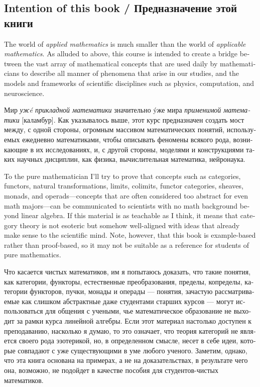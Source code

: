 \documentclass{book}
\theoremstyle{theoremENG}
\theoremstyle{lemmaENG}
\theoremstyle{propositionENG}
\theoremstyle{corollaryENG}
\theoremstyle{factENG}
\theoremstyle{remarkENG}
\theoremstyle{exampleENG}
\theoremstyle{warningENG}
\theoremstyle{questionENG}
\theoremstyle{guessENG}
\theoremstyle{answerENG}
\theoremstyle{constructionENG}
\theoremstyle{rulesENG}
\theoremstyle{excENG}
\theoremstyle{appENG}
\theoremstyle{definitionENG}
\theoremstyle{notationENG}
\theoremstyle{conjectureENG}
\theoremstyle{postulateENG}
\theoremstyle{theoremRUS}
\theoremstyle{lemmaRUS}
\theoremstyle{propositionRUS}
\theoremstyle{corollaryRUS}
\theoremstyle{factRUS}
\theoremstyle{remarkRUS}
\theoremstyle{exampleRUS}
\theoremstyle{warningRUS}
\theoremstyle{questionRUS}
\theoremstyle{guessRUS}
\theoremstyle{answerRUS}
\theoremstyle{constructionRUS}
\theoremstyle{rulesRUS}
\theoremstyle{excRUS}
\theoremstyle{appRUS}
\theoremstyle{definitionRUS}
\theoremstyle{notationRUS}
\theoremstyle{conjectureRUS}
\theoremstyle{postulateRUS}
\begin{document}
\begin{english}

\section{Intention of this book / Предназначение этой книги}

The world of {\em applied mathematics} is much smaller than the world of {\em applicable mathematics}. As alluded to above, this course is intended to create a bridge between the vast array of mathematical concepts that are used daily by mathematicians to describe all manner of phenomena that arise in our studies, and the models and frameworks of scientific disciplines such as physics, computation, and neuroscience.

\begin{russian}Мир {\em уж\'e прикладной математики} значительно \'yже мира {\em применимой математики} [каламбур]. Как указывалось выше, этот курс предназначен создать мост между, с одной стороны, огромным массивом математических понятий, используемых ежедневно математиками, чтобы описывать феномены всякого рода, возникающие в их исследованиях, и, с другой стороны, моделями и конструкциями таких научных дисциплин, как физика, вычислительная математика, нейронаука. \end{russian}

To the pure mathematician I'll try to prove that concepts such as categories, functors, natural transformations, limits, colimits, functor categories, sheaves, monads, and operads---concepts that are often considered too abstract for even math majors---can be communicated to scientists with no math background beyond linear algebra. If this material is as teachable as I think, it means that category theory is not esoteric but somehow well-aligned with ideas that already make sense to the scientific mind. Note, however, that this book is example-based rather than proof-based, so it may not be suitable as a reference for students of pure mathematics.

\begin{russian}Что касается чистых математиков, им я попытаюсь доказать, что такие понятия, как категории, функторы, естественные преобразования, пределы, копределы, категории функторов, пучки, монады и операды — понятия, зачастую рассматриваемые как слишком абстрактные даже студентами старших курсов — могут использоваться для общения с учеными, чье математическое образование не выходит за рамки курса линейной алгебры. Если этот материал настолько доступен к преподаванию, насколько я думаю, то это означает, что теория категорий не является своего рода эзотерикой, но, в определенном смысле, несет в себе идеи, которые совпадают с уже существующими в уме любого ученого. Заметим, однако, что эта книга основана на примерах, а не на доказательствах, в результате чего она, возможно, не подойдет в качестве пособия для студентов-чистых математиков. \end{russian}


\end{english}
\end{document}
